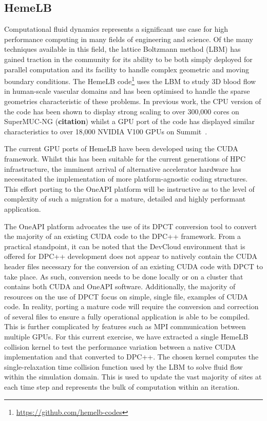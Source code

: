 \documentclass[../main]{subfiles}
\begin{document}
\subsection{HemeLB}\label{sec:hemelb}

Computational fluid dynamics represents a significant use case for high performance computing in many fields of engineering and science.
Of the many techniques available in this field, the lattice Boltzmann method (LBM) has gained traction in the community for its ability to be both simply deployed for parallel computation and its facility to handle complex geometric and moving boundary conditions.
The HemeLB code\footnote{\url{https://github.com/hemelb-codes}} uses the LBM to study 3D blood flow in human-scale vascular domains and has been optimised to handle the sparse geometries characteristic of these problems.
In previous work, the CPU version of the code has been shown to display strong scaling to over 300,000 cores on SuperMUC-NG (\textbf{citation}) whilst a GPU port of the code has displayed similar characteristics to over 18,000 NVIDIA V100 GPUs on Summit~\cite{zacharoudiou_development_2022}.

The current GPU ports of HemeLB have been developed using the CUDA framework.
Whilst this has been suitable for the current generations of HPC infrastructure, the imminent arrival of alternative accelerator hardware has necessitated the implementation of more platform-agnostic coding structures.
This effort porting to the OneAPI platform will be instructive as to the level of complexity of such a migration for a mature, detailed and highly performant application.

The OneAPI platform advocates the use of its DPCT conversion tool to convert the majority of an existing CUDA code to the DPC++ framework.
From a practical standpoint, it can be noted that the DevCloud environment that is offered for DPC++ development does not appear to natively contain the CUDA header files necessary for the conversion of an existing CUDA code with DPCT to take place.
As such, conversion needs to be done locally or on a cluster that contains both CUDA and OneAPI software.
Additionally, the majority of resources on the use of DPCT focus on simple, single file, examples of CUDA code.
In reality, porting a mature code will require the conversion and correction of several files to ensure a fully operational application is able to be compiled.
This is further complicated by features such as MPI communication between multiple GPUs.
For this current exercise, we have extracted a single HemeLB collision kernel to test the performance variation between a native CUDA implementation and that converted to DPC++.
The chosen kernel computes the single-relaxation time collision function used by the LBM to solve fluid flow within the simulation domain.
This is used to update the vast majority of sites at each time step and represents the bulk of computation within an iteration.
\end{document}
